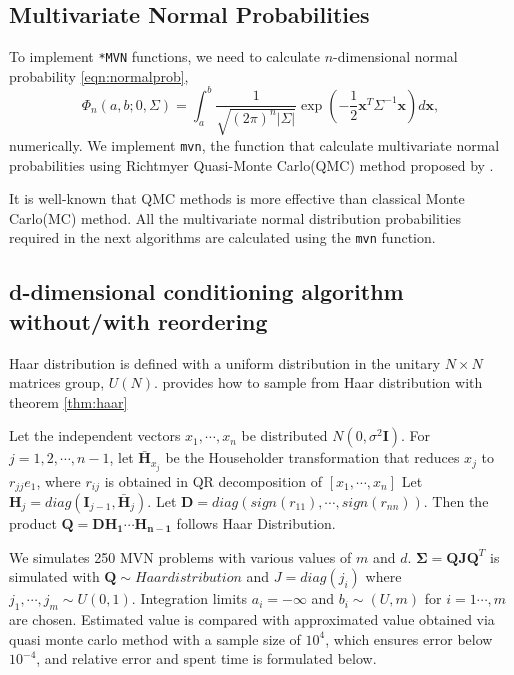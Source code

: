 \subsection{Multivariate Normal Probabilities} 

To implement \texttt{*MVN} functions, we need to calculate $n$-dimensional normal probability \eqref{eqn:normalprob},
$$
\Phi_n(a, b; 0, \Sigma) = \int_a^b \frac{1}{\sqrt{(2\pi)^n |\Sigma|}} \exp\left( -\frac{1}{2} \mathbf{x}^T \Sigma^{-1} \mathbf{x} \right) d\mathbf{x},
$$ 
numerically. We implement \texttt{mvn}, the function that calculate multivariate normal probabilities using Richtmyer Quasi-Monte Carlo(QMC) method proposed by \citet{genz2009computation}.


It is well-known that QMC methods is more effective than classical Monte Carlo(MC) method. All the multivariate normal distribution probabilities required in the next algorithms are calculated using the \texttt{mvn} function.

\subsection{d-dimensional conditioning algorithm without/with reordering}

Haar distribution is defined with a uniform distribution in the unitary $N\times N$ matrices group, $U(N)$.
\citet{stewart1980efficient} provides how to sample from Haar distribution with theorem \ref{thm:haar}

\begin{theorem}\label{thm:haar}\citet{stewart1980efficient}
	Let the independent vectors $x_1,\cdots,x_{n}$ be distributed $N(0,\sigma^2 \mathbf{I})$. For $j=1,2,\cdots,n-1$, let $\mathbf{\bar{H}}_{x_j}$ be the Householder transformation that reduces $x_j$ to $r_{jj}e_1$, where $r_{ij}$ is obtained in QR decomposition of $[x_1,\cdots,x_n]$ Let $\mathbf{H}_j=diag(\mathbf{I}_{j-1},\bar{\mathbf{H}}_j)$. Let $\mathbf{D}=diag(sign(r_{11}), \cdots, sign(r_{nn}))$. Then the product $\mathbf{Q}=\mathbf{DH_1\cdots H_{n-1}}$ follows Haar Distribution.
\end{theorem}

We simulates 250 MVN problems with various values of $m$ and $d$. $\mathbf{\Sigma}=\mathbf{Q}\mathbf{J}\mathbf{Q}^T$ is simulated with $\mathbf{Q}\sim{Haar distribution}$ and $J=diag(j_i)$ where $j_1,\cdots,j_m\sim U(0,1)$. Integration limits $a_i=-\infty$ and $b_i\sim(U,m)$ for $i=1\cdots,m$ are chosen. Estimated value is compared with approximated value obtained via quasi monte carlo method with a sample size of $10^4$, which ensures error below $10^{-4}$, and relative error and spent time is formulated below.

